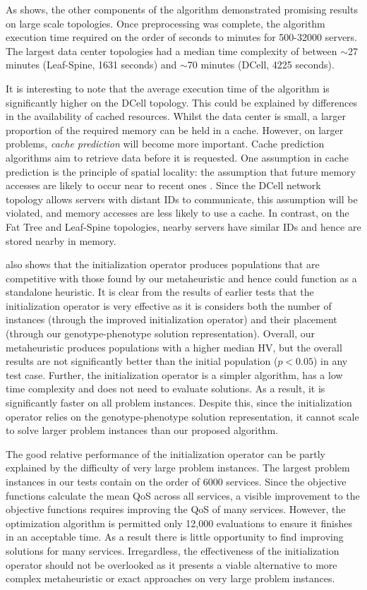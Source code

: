 As  shows, the other components of the algorithm demonstrated promising results on large scale topologies. Once preprocessing was complete, the algorithm execution time required on the order of seconds to minutes for 500-32000 servers. The largest data center topologies had a median time complexity of between $\sim$27 minutes (Leaf-Spine, 1631 seconds) and $\sim$70 minutes (DCell, 4225 seconds). 

It is interesting to note that the average execution time of the algorithm is significantly higher on the DCell topology. This could be explained by differences in the availability of cached resources. Whilst the data center is small, a larger proportion of the required memory can be held in a cache. However, on larger problems, \textit{cache prediction} will become more important. Cache prediction algorithms aim to retrieve data before it is requested. One assumption in cache prediction is the principle of spatial locality: the assumption that future memory accesses are likely to occur near to recent ones \cite{KennedyM92}. Since the DCell network topology allows servers with distant IDs to communicate, this assumption will be violated, and memory accesses are less likely to use a cache. In contrast, on the Fat Tree and Leaf-Spine topologies, nearby servers have similar IDs and hence are stored nearby in memory.

 also shows that the initialization operator produces populations that are competitive with those found by our metaheuristic and hence could function as a standalone heuristic. It is clear from the results of earlier tests that the initialization operator is very effective as it is considers both the number of instances (through the improved initialization operator) and their placement (through our genotype-phenotype solution representation). Overall, our metaheuristic produces populations with a higher median HV, but the overall results are not significantly better than the initial population ($p < 0.05$) in any test case. Further, the initialization operator is a simpler algorithm, has a low time complexity and does not need to evaluate solutions. As a result, it is significantly faster on all problem instances. Despite this, since the initialization operator relies on the genotype-phenotype solution representation, it cannot scale to solve larger problem instances than our proposed algorithm.

The good relative performance of the initialization operator can be partly explained by the difficulty of very large problem instances. The largest problem instances in our tests contain on the order of 6000 services. Since the objective functions calculate the mean QoS across all services, a visible improvement to the objective functions requires improving the QoS of many services. However, the optimization algorithm is permitted only 12,000 evaluations to ensure it finishes in an acceptable time. As a result there is little opportunity to find improving solutions for many services. Irregardless, the effectiveness of the initialization operator should not be overlooked as it presents a viable alternative to more complex metaheuristic or exact approaches on very large problem instances.